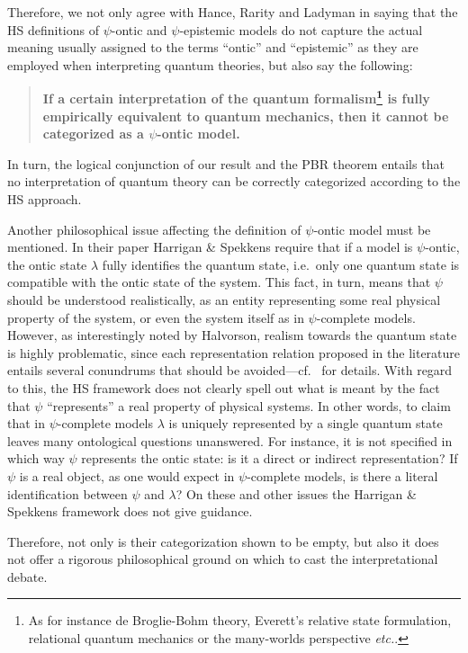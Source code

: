 \documentclass[10pt,twocolumn, nofootinbib]{revtex4-2}
\begin{document}
Therefore, we not only agree with Hance, Rarity and Ladyman in saying that the HS definitions of $\psi$-ontic and $\psi$-epistemic models do not capture the actual meaning usually assigned to the terms ``ontic'' and ``epistemic'' as they are employed when interpreting quantum theories, but also say the following:
\begin{quote}
	\textbf{If a certain interpretation of the quantum formalism\footnote{As for instance de Broglie-Bohm theory, Everett's relative state formulation, relational quantum mechanics or the many-worlds perspective \emph{etc.}.} is fully empirically equivalent to quantum mechanics, then it cannot be categorized as a $\psi$-ontic model.}
\end{quote}
\noindent In turn, the logical conjunction of our result and the PBR theorem entails that no interpretation of quantum theory can be correctly categorized according to the HS approach.

Another philosophical issue affecting the definition of $\psi$-ontic model must be mentioned. In their paper Harrigan \& Spekkens require that if a model is $\psi$-ontic, the ontic state $\lambda$ fully identifies the quantum state, i.e.\ only one quantum state is compatible with the ontic state of the system. This fact, in turn, means that $\psi$ should be understood realistically, as an entity representing some real physical property of the system, or even the system itself as in $\psi$-complete models. However, as interestingly noted by Halvorson, realism towards the quantum state is highly problematic, since each representation relation proposed in the literature entails several conundrums that should be avoided---cf.\  \cite{Halvorson:2019} for details. With regard to this, the HS framework does not clearly spell out what is meant by the fact that $\psi$ ``represents'' a real property of physical systems. In other words, to claim that in $\psi$-complete models $\lambda$ is uniquely represented by a single quantum state leaves many ontological questions unanswered. For instance, it is not specified in which way $\psi$ represents the ontic state: is it a direct or indirect representation? If $\psi$ is a real object, as one would expect in $\psi$-complete models, is there a literal identification between $\psi$ and $\lambda$? On these and other issues the Harrigan \& Spekkens framework does not give guidance.

Therefore, not only is their categorization shown to be empty, but also it does not offer a rigorous philosophical ground on which to cast the interpretational debate.
\end{document}
